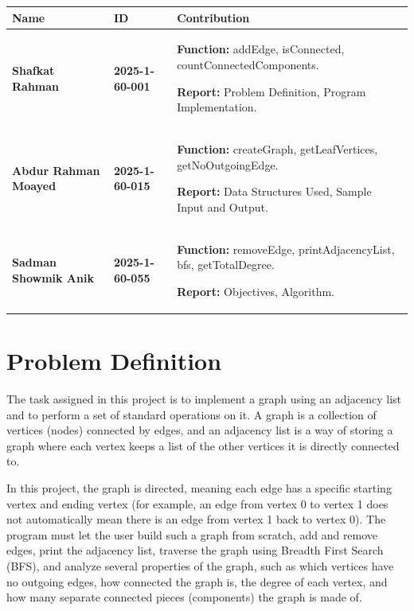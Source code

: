 \documentclass[11pt]{article}
\begin{document}
\begin{titlepage}
\renewcommand{\arraystretch}{1.35}
\begin{tabularx}{\textwidth}{|>{\centering\arraybackslash}m{3.3cm}|>{\centering\arraybackslash}m{2.6cm}|X|}
\hline
\textbf{\color{headingblue}Name} & \textbf{\color{headingblue}ID} & \centering\arraybackslash\textbf{\color{headingblue}Contribution} \\
\hline
\textbf{Shafkat Rahman} & \textbf{2025-1-60-001} &
\textbf{\color{headingblue}Function:} addEdge, isConnected, countConnectedComponents. \par\smallskip
\textbf{\color{headingblue}Report:} Problem Definition, Program Implementation. \\
\hline
\textbf{Abdur Rahman Moayed} & \textbf{2025-1-60-015} &
\textbf{\color{headingblue}Function:} createGraph, getLeafVertices, getNoOutgoingEdge. \par\smallskip
\textbf{\color{headingblue}Report:} Data Structures Used, Sample Input and Output. \\
\hline
\textbf{Sadman Showmik Anik} & \textbf{2025-1-60-055} &
\textbf{\color{headingblue}Function:} removeEdge, printAdjacencyList, bfs, getTotalDegree. \par\smallskip
\textbf{\color{headingblue}Report:} Objectives, Algorithm. \\
\hline
\end{tabularx}
\renewcommand{\arraystretch}{1}

\end{titlepage}

\section{Problem Definition}

The task assigned in this project is to implement a graph using an adjacency list and to perform a set of standard operations on it. A graph is a collection of vertices (nodes) connected by edges, and an adjacency list is a way of storing a graph where each vertex keeps a list of the other vertices it is directly connected to.

In this project, the graph is directed, meaning each edge has a specific starting vertex and ending vertex (for example, an edge from vertex 0 to vertex 1 does not automatically mean there is an edge from vertex 1 back to vertex 0). The program must let the user build such a graph from scratch, add and remove edges, print the adjacency list, traverse the graph using Breadth First Search (BFS), and analyze several properties of the graph, such as which vertices have no outgoing edges, how connected the graph is, the degree of each vertex, and how many separate connected pieces (components) the graph is made of.
\end{document}
